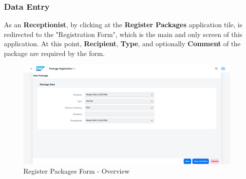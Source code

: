 \subsubsection{Data Entry}

As an \textbf{Receptionist}, by clicking at the \textbf{Register Packages} application tile, is redirected to the "Registration Form", which is the main and only screen of this application. At this point, \textbf{Recipient}, \textbf{Type}, \textbf{} and optionally \textbf{Comment} of the package are required by the form. 

\begin{figure}[H]
	\centering
	\includegraphics[width=1\linewidth]{images/user_doc/registration/overview.png}
	\caption{Register Packages Form - Overview}
	\label{fig:RPOverview}
\end{figure}


